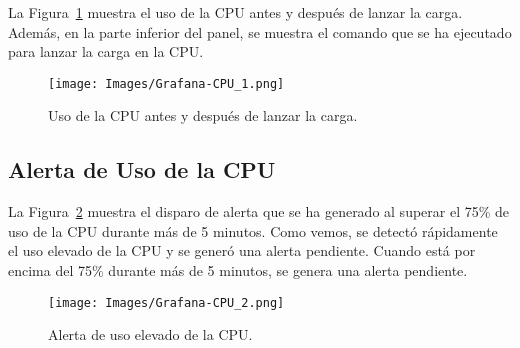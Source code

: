 \documentclass[a4paper,12pt]{article}
\begin{document}
La Figura~\ref{fig:Grafana-CPU_1} muestra el uso de la CPU antes y después de lanzar la carga. Además, en la parte inferior del panel, se muestra el comando que se ha ejecutado para lanzar la carga en la CPU.
\begin{figure}[h]
    \centering
    \texttt{[image: Images/Grafana-CPU\_1.png]}
    \caption{Uso de la CPU antes y después de lanzar la carga.}
    \label{fig:Grafana-CPU_1}
\end{figure}
\subsection{Alerta de Uso de la CPU}
La Figura~\ref{fig:Grafana-CPU_2} muestra el disparo de alerta que se ha generado al superar el 75\% de uso de la CPU durante más de 5 minutos. Como vemos, se detectó rápidamente el uso elevado de la CPU y se generó una alerta pendiente. Cuando está por encima del 75\% durante más de 5 minutos, se genera una alerta pendiente.
\begin{figure}[h]
    \centering
    \texttt{[image: Images/Grafana-CPU\_2.png]}
    \caption{Alerta de uso elevado de la CPU.}
    \label{fig:Grafana-CPU_2}
\end{figure}
\end{document}

